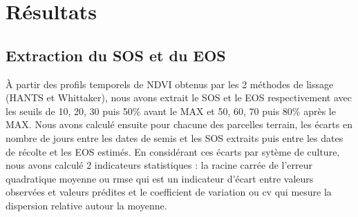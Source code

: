 \section{Résultats}

\subsection{Extraction du SOS et du EOS}

\`A partir des profils temporels de NDVI obtenus par les 2 méthodes de lissage (HANTS et Whittaker), nous avons extrait le SOS et le EOS respectivement avec les seuils de 10, 20, 30 puis 50\% avant le MAX et 50, 60, 70 puis 80\% après le MAX. Nous avons calculé ensuite pour chacune des parcelles terrain, les écarts en nombre de jours entre les dates de semis et les SOS extraits puis entre les dates de récolte et les EOS estimés. En considérant ces écarts par sytème de culture, nous avons calculé 2 indicateurs statistiques : la racine carrée de l'erreur quadratique moyenne ou \acrshort{rmse} qui est un indicateur d'écart entre valeurs observées et valeurs prédites et le coefficient de variation ou \acrshort{cv} qui mesure la dispersion relative autour la moyenne. 

